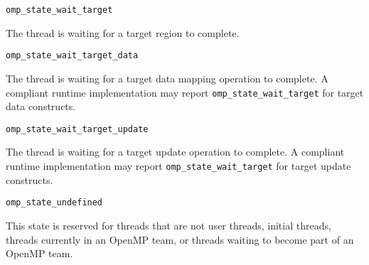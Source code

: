 \begin{description}

\item \verb|omp_state_wait_target| 

  The thread is waiting for a target region to complete.
  
\item \verb|omp_state_wait_target_data| 

  The thread is waiting for a target data mapping operation to complete. 
  A  compliant runtime implementation may report \verb|omp_state_wait_target| for target data constructs.

\item \verb|omp_state_wait_target_update| 

  The thread is waiting for a target  update operation to complete. 
  A  compliant runtime implementation may report \verb|omp_state_wait_target| for target update constructs.

\end{description}



\begin{description}
\item \verb|omp_state_undefined| 

  This state is reserved for threads that are not user threads,
  initial threads, threads currently in an OpenMP team, or threads
  waiting to become part of an OpenMP team.

\end{description}

\begin{comment}
\section{OMPT Inquiry Functions}
\label{sec:omptFunctions}


 Inquiry functions retrieve data from the execution environment for
 the tools. 
 All functions in the inquiry API are marked with \verb|OMPT_API|. These functions should not be global symbols in an OpenMP runtime implementation to avoid tempting tool developers to call them directly. Section~\ref{sec:init} describes how a tool should obtain pointers to these inquiry functions.
 {\em All inquiry functions are async signal safe.} 
 Note that it is unsafe to call OpenMP Execution Environment Routines within an OMPT callback because doing so may cause deadlock. 
 Specifically, since OpenMP Execution Library Routines are not guaranteed to be async signal safe, they might acquire a lock that may already be held when an OMPT callback is involved.
\end{comment}
 
